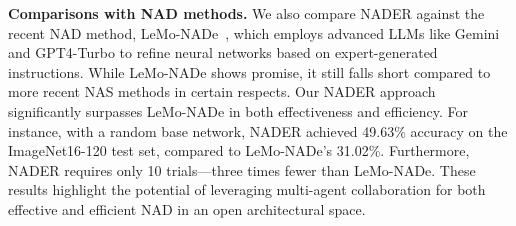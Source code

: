 \textbf{Comparisons with NAD methods.} We also compare NADER against the recent NAD method, LeMo-NADe~\cite{rahman2024lemo}, which employs advanced LLMs like Gemini and GPT4-Turbo to refine neural networks based on expert-generated instructions. While LeMo-NADe shows promise, it still falls short compared to more recent NAS methods in certain respects. Our NADER approach significantly surpasses LeMo-NADe in both effectiveness and efficiency. For instance, with a random base network, NADER achieved 49.63\% accuracy on the ImageNet16-120 test set, compared to LeMo-NADe's 31.02\%. Furthermore, NADER requires only 10 trials—three times fewer than LeMo-NADe. These results highlight the potential of leveraging multi-agent collaboration for both effective and efficient NAD in an open architectural space.

\begin{table}[t]
    \centering
    \caption{Ablation studies of Research Team. Experiments are conducted on CIFAR10, CIFAR100, and ImageNet16-120 datasets. We report the results of neural architecture modifications for 5 iterations and show the mean and standard deviation from three repeated runs with different random seed.
    ``R'' and ``P'' represent Reader and Proposer respectively.
    }
    \label{tab:reader}
\end{table}


